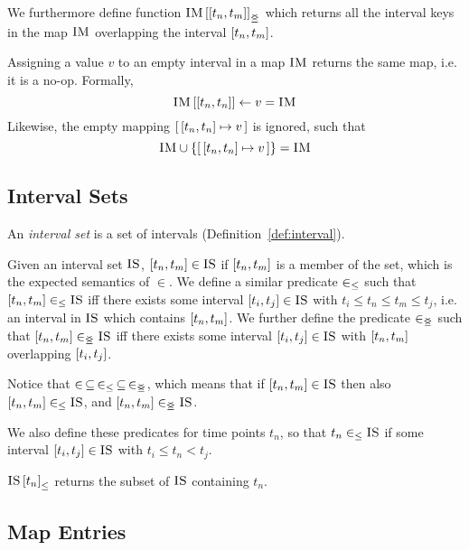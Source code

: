 We furthermore define function $\overlapping{\map{IM}}{t_n}{t_m}$ which returns all the interval keys in the map $\textsc{IM}$ overlapping the interval $\interval{t_n}{t_m}$. 

Assigning a value $v$ to an empty interval in a map $\textsc{IM}$ returns the same map, i.e. it is a no-op. Formally,
\[
  \lookup{\map{IM}}{\interval{t_n}{t_n}} \assign v = \map{IM}
\]
Likewise, the empty mapping $\intervalmapping{t_n}{t_n}{v}$ is ignored, such that
\[
  \map{IM} \cup \set{\intervalmapping{t_n}{t_n}{v}} = \map{IM}
\]

\subsection{Interval Sets}
\label{sub:interval-sets}

\begin{definition}
  An \emph{interval set} is a set of intervals (Definition~\vref{def:interval}). 
\end{definition}

Given an interval set $\textsc{IS}$, $\interval{t_n}{t_m} \in \map{IS}$ if $\interval{t_n}{t_m}$ is a member of the set, which is the expected semantics of $\in$. We define a similar predicate $\in_\leq$ such that $\interval{t_n}{t_m} \inn \map{IS}$ iff there exists some interval $\interval{t_i}{t_j} \in \map{IS}$ with $t_i \leq t_n \leq t_m \leq t_j$, i.e. an interval in $\textsc{IS}$ which contains $\interval{t_n}{t_m}$. We further define the predicate $\in_{\leq\!\!\!\!\geq{}}$ such that $\interval{t_n}{t_m} \innr \map{IS}$ iff there exists some interval $\interval{t_i}{t_j} \in \map{IS}$ with $\interval{t_n}{t_m}$ overlapping $\interval{t_i}{t_j}$. 

Notice that $\in \, \subseteq \, \in_\leq \, \subseteq \, \in_{\leq\!\!\!\!\geq{}}$, which means that if $\interval{t_n}{t_m} \in \map{IS}$ then also $\interval{t_n}{t_m} \inn \map{IS}$, and $\interval{t_n}{t_m} \innr \map{IS}$. 

We also define these predicates for time points $t_n$, so that $t_n \in_\leq \textsc{IS}$ if some interval $\interval{t_i}{t_j} \in \map{IS}$ with $t_i \leq t_n < t_j$. 

${\textsc{IS} \left[ t_n \right]}_{\leq}$ returns the subset of $\textsc{IS}$ containing $t_n$.

\subsection{Map Entries}
\label{sub:map-entries}

